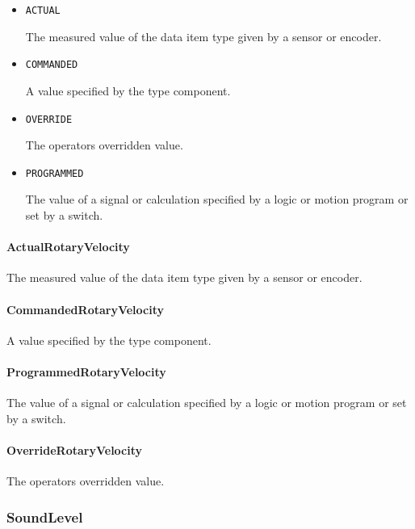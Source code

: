 \begin{itemize}

\item \texttt{ACTUAL}


The measured value of the data item type given by a sensor or encoder.

\item \texttt{COMMANDED}


A value specified by the  type component.

\item \texttt{OVERRIDE}


The operators overridden value.

\item \texttt{PROGRAMMED}


The value of a signal or calculation specified by a logic or motion program or set by a switch.


\end{itemize}

\paragraph{ActualRotaryVelocity}\mbox{}
\label{sec:ActualRotaryVelocity}


The measured value of the data item type given by a sensor or encoder.


\paragraph{CommandedRotaryVelocity}\mbox{}
\label{sec:CommandedRotaryVelocity}


A value specified by the  type component.


\paragraph{ProgrammedRotaryVelocity}\mbox{}
\label{sec:ProgrammedRotaryVelocity}


The value of a signal or calculation specified by a logic or motion program or set by a switch.


\paragraph{OverrideRotaryVelocity}\mbox{}
\label{sec:OverrideRotaryVelocity}


The operators overridden value.


\subsubsection{SoundLevel}
\label{sec:SoundLevel}



